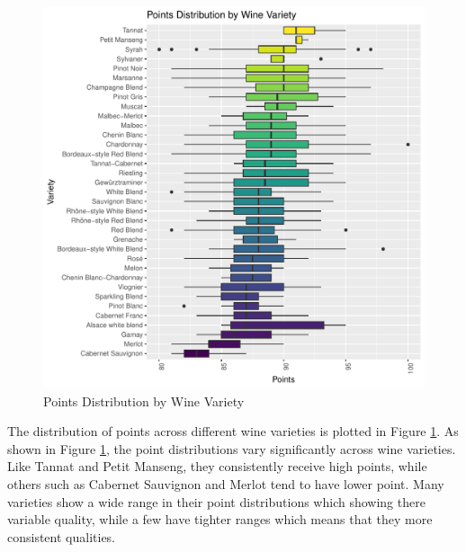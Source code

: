 \documentclass{article}
\begin{document}
\begin{figure}[htbp]
\begin{minipage}{0.45\textwidth}
	\includegraphics[width=\textwidth]{imgs/points_variety_1.pdf}
	\caption{Points Distribution by Wine Variety}
	\label{fig:points_variety}
	\end{minipage}
\end{figure}
	


The distribution of points across different wine varieties is plotted in Figure \ref{fig:points_variety}. As shown in Figure \ref{fig:points_variety}, the point distributions vary significantly across wine varieties. Like Tannat and Petit Manseng, they consistently receive high points, while others such as Cabernet Sauvignon and Merlot tend to have lower point. Many varieties show a wide range in their point distributions which showing there variable quality, while a few have tighter ranges which means that they more consistent qualities. 
\end{document}
